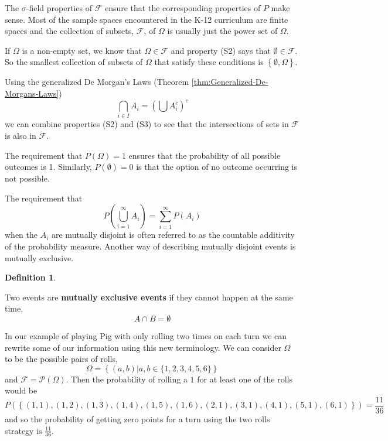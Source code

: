 \documentclass[
]{book}
\theoremstyle{definition}
\newtheorem{definition}{Definition}[chapter]
\theoremstyle{definition}
\theoremstyle{definition}
\theoremstyle{definition}
\theoremstyle{remark}
\begin{document}
The \(\sigma\)-field properties of \(\mathcal{F}\) ensure that the corresponding properties of \(P\) make sense. Most of the sample spaces encountered in the K-12 curriculum are finite spaces and the collection of subsets, \(\mathcal{F}\), of \(\Omega\) is usually just the power set of \(\Omega\).

If \(\Omega\) is a non-empty set, we know that \(\Omega \in \mathcal{F}\) and property (S2) says that \(\emptyset\in \mathcal{F}\). So the smallest collection of subsets of \(\Omega\) that satisfy these conditions is \(\left\{ \emptyset, \Omega \right\}\).

Using the generalized De Morgan's Laws (Theorem \ref{thm:Generalized-De-Morgans-Laws})
\[\bigcap_{i\in I} A_i = \left( \bigcup A_i^c \right)^c\] we can combine properties (S2) and (S3) to see that the intersections of sets in \(\mathcal{F}\) is also in \(\mathcal{F}\).

The requirement that \(P(\Omega)=1\) ensures that the probability of all possible outcomes is 1. Similarly, \(P(\emptyset)=0\) is that the option of no outcome occurring is not possible.

The requirement that \[P\left(\bigcup_{i=1}^\infty A_i \right) = \sum_{i=1}^\infty P(A_i)\] when the \(A_i\) are mutually disjoint is often referred to as the countable additivity of the probability measure. Another way of describing mutually disjoint events is mutually exclusive.

\begin{definition}
\protect\hypertarget{def:unlabeled-div-307}{}\label{def:unlabeled-div-307}

Two events are \textbf{mutually exclusive events} if they cannot happen at the same time.
\[A\cap B =\emptyset\]

\end{definition}

In our example of playing Pig with only rolling two times on each turn we can rewrite some of our information using this new terminology. We can consider \(\Omega\) to be the possible pairs of rolls, \[\Omega = \left\{ (a,b) \vert a,b\in \{1,2,3,4,5,6\} \right\}\] and \(\mathcal{F} = \mathcal{P}\left(\Omega \right)\). Then the probability of rolling a \(1\) for at least one of the rolls would be
\[P\left( \left\{ (1,1), (1,2), (1,3), (1,4), (1,5), (1,6), (2,1), (3,1), (4,1), (5,1), (6,1) \right\} \right) = \frac{11}{36}\] and so the probability of getting zero points for a turn using the two rolls strategy is \(\frac{11}{36}\).
\end{document}
